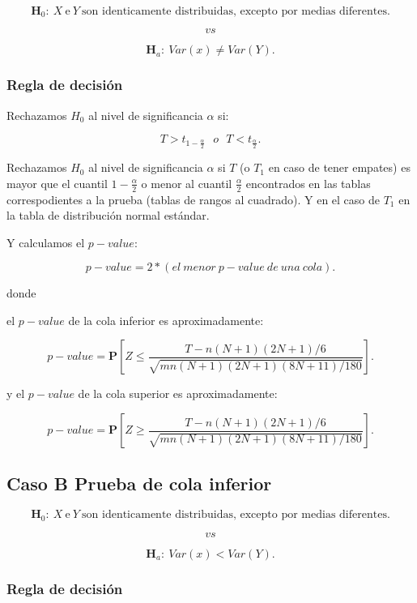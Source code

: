 \documentclass[
  a4paper,
  oneside,
  openany]{book}
\begin{document}
\[\textbf{H}_0: \ X \ \mbox{e} \  Y \ \mbox{son identicamente distribuidas, excepto por medias diferentes.}\]

\[vs\]

\[\textbf{H}_a: \ Var(x) \neq  Var(Y).\]

\hypertarget{regla-de-decisiuxf3n-17}{%
\subsubsection*{Regla de decisión}\label{regla-de-decisiuxf3n-17}}


Rechazamos \(H_0\) al nivel de significancia \(\alpha\) si:

\[T>t_{1-\frac{\alpha}{2}} \ \ \   o \ \ \  T<t_{\frac{\alpha}{2}}.\]

Rechazamos \(H_0\) al nivel de significancia \(\alpha\) si \(T\) (o \(T_1\) en caso de tener empates) es mayor que el cuantil \(1-\frac{\alpha}{2}\) o menor al cuantil \(\frac{\alpha}{2}\) encontrados en las tablas correspodientes a la prueba (tablas de rangos al cuadrado). Y en el caso de \(T_{1}\) en la tabla de distribución normal estándar.

Y calculamos el \(p-value\):

\[p-value= 2*(el \ menor\ p-value\ de\ una\ cola).\]

donde

el \(p-value\) de la cola inferior es aproximadamente:

\[ p-value=\mathbf{P}\left[Z\leq\frac{T-n(N+1)(2N+1)/6}{\sqrt{mn(N+1)(2N+1)(8N+11)/180}}\right].\]

y el \(p-value\) de la cola superior es aproximadamente:

\[p-value=\mathbf{P}\left[Z\geq\frac{T-n(N+1)(2N+1)/6}{\sqrt{mn(N+1)(2N+1)(8N+11)/180}}\right].\]

\hypertarget{caso-b-prueba-de-cola-inferior-5}{%
\subsection*{Caso B Prueba de cola inferior}\label{caso-b-prueba-de-cola-inferior-5}}


\[\textbf{H}_0: \ X \  \mbox{e} \  Y \ \mbox{son identicamente distribuidas, excepto por medias diferentes.}\]

\[vs\]

\[\textbf{H}_a: \ Var(x) < Var(Y).\]

\hypertarget{regla-de-decisiuxf3n-18}{%
\subsubsection*{Regla de decisión}\label{regla-de-decisiuxf3n-18}}
\end{document}
